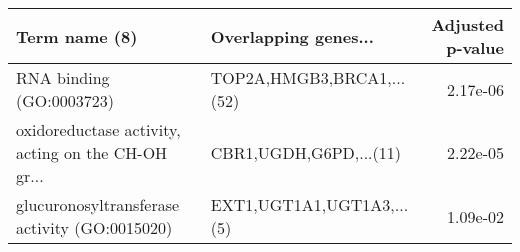 \begin{tabular}{llr}
\toprule
                                     Term name (8) &      Overlapping genes... &  Adjusted p-value \\
\midrule
                          RNA binding (GO:0003723) & TOP2A,HMGB3,BRCA1,...(52) &          2.17e-06 \\
oxidoreductase activity, acting on the CH-OH gr... &    CBR1,UGDH,G6PD,...(11) &          2.22e-05 \\
     glucuronosyltransferase activity (GO:0015020) & EXT1,UGT1A1,UGT1A3,...(5) &          1.09e-02 \\
\bottomrule
\end{tabular}
